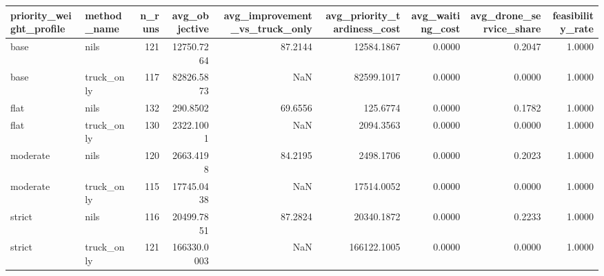\begin{tabular}{llrrrrrrr}
\toprule
priority_weight_profile & method_name & n_runs & avg_objective & avg_improvement_vs_truck_only & avg_priority_tardiness_cost & avg_waiting_cost & avg_drone_service_share & feasibility_rate \\
\midrule
base & nils & 121 & 12750.7264 & 87.2144 & 12584.1867 & 0.0000 & 0.2047 & 1.0000 \\
base & truck_only & 117 & 82826.5873 & NaN & 82599.1017 & 0.0000 & 0.0000 & 1.0000 \\
flat & nils & 132 & 290.8502 & 69.6556 & 125.6774 & 0.0000 & 0.1782 & 1.0000 \\
flat & truck_only & 130 & 2322.1001 & NaN & 2094.3563 & 0.0000 & 0.0000 & 1.0000 \\
moderate & nils & 120 & 2663.4198 & 84.2195 & 2498.1706 & 0.0000 & 0.2023 & 1.0000 \\
moderate & truck_only & 115 & 17745.0438 & NaN & 17514.0052 & 0.0000 & 0.0000 & 1.0000 \\
strict & nils & 116 & 20499.7851 & 87.2824 & 20340.1872 & 0.0000 & 0.2233 & 1.0000 \\
strict & truck_only & 121 & 166330.0003 & NaN & 166122.1005 & 0.0000 & 0.0000 & 1.0000 \\
\bottomrule
\end{tabular}
